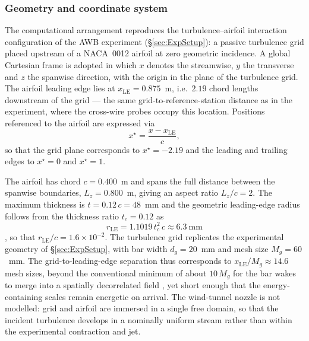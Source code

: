 \documentclass[lineno]{JFM-FLM_Au}
\begin{document}
\subsubsection{Geometry and coordinate system}

The computational arrangement reproduces the turbulence--airfoil
interaction configuration of the AWB experiment
(\S\ref{sec:ExpSetup}): a passive turbulence grid placed upstream of a
NACA~0012 airfoil at zero geometric incidence. A global Cartesian
frame is adopted in which $x$ denotes the streamwise, $y$ the
transverse and $z$ the spanwise direction, with the origin in the
plane of the turbulence grid. The airfoil leading edge lies at
$x_{\mathrm{LE}} = 0.875$~m, i.e.\ $2.19$ chord lengths downstream of
the grid --- the same grid-to-reference-station distance as in the
experiment, where the cross-wire probes occupy this location.
Positions referenced to the airfoil are expressed via
\begin{equation}
  x^{\star} = \frac{x - x_{\mathrm{LE}}}{c},
  \label{eq:xstar_def}
\end{equation}
so that the grid plane corresponds to $x^{\star} = -2.19$ and the
leading and trailing edges to $x^{\star} = 0$ and $x^{\star} = 1$.

The airfoil has chord $c = 0.400$~m and spans the full distance
between the spanwise boundaries, $L_z = 0.800$~m, giving an aspect
ratio $L_z/c = 2$. The maximum thickness is $t = 0.12\,c = 48$~mm and
the geometric leading-edge radius follows from the thickness ratio
$t_c = 0.12$ as
\begin{equation}
  r_{\mathrm{LE}} = 1.1019\,t_c^{2}\,c \approx 6.3~\mathrm{mm}
  \label{eq:rLE_def}
\end{equation}
\citep{AbbottDoenhoff1959}, so that
$r_{\mathrm{LE}}/c = 1.6\times10^{-2}$. The turbulence grid replicates
the experimental geometry of \S\ref{sec:ExpSetup}, with bar width
$d_g = 20$~mm and mesh size $M_g = 60$~mm.
The grid-to-leading-edge separation thus corresponds to
$x_{\mathrm{LE}}/M_g \approx 14.6$ mesh sizes, beyond the conventional
minimum of about $10\,M_g$ for the bar wakes to merge into a
spatially decorrelated field \citep{Roach1987,ComteBellotCorrsin1971},
yet short enough that the energy-containing scales remain energetic
on arrival. The wind-tunnel nozzle is not modelled: grid and airfoil
are immersed in a single free domain, so that the incident turbulence
develops in a nominally uniform stream rather than within the
experimental contraction and jet.
\end{document}
